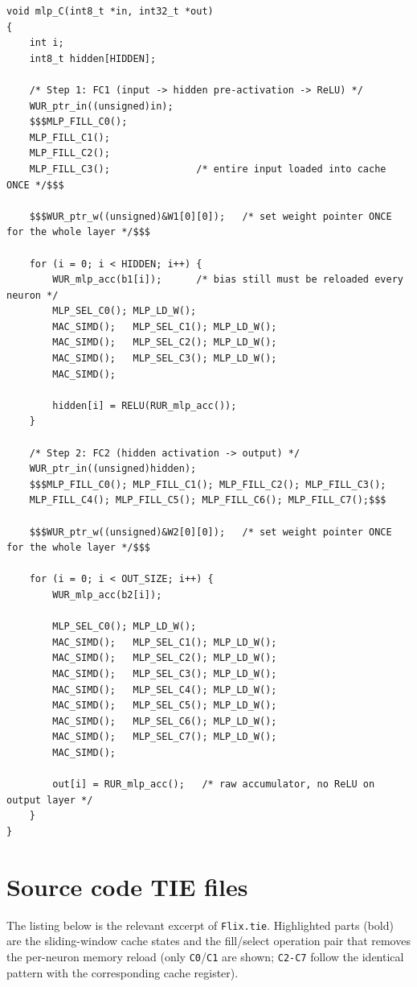 \documentclass[11pt,a4paper]{report}
\begin{document}
\begin{lstlisting}
void mlp_C(int8_t *in, int32_t *out)
{
    int i;
    int8_t hidden[HIDDEN];

    /* Step 1: FC1 (input -> hidden pre-activation -> ReLU) */
    WUR_ptr_in((unsigned)in);
    $$$MLP_FILL_C0();
    MLP_FILL_C1();
    MLP_FILL_C2();
    MLP_FILL_C3();               /* entire input loaded into cache ONCE */$$$

    $$$WUR_ptr_w((unsigned)&W1[0][0]);   /* set weight pointer ONCE for the whole layer */$$$

    for (i = 0; i < HIDDEN; i++) {
        WUR_mlp_acc(b1[i]);      /* bias still must be reloaded every neuron */
        MLP_SEL_C0(); MLP_LD_W();
        MAC_SIMD();   MLP_SEL_C1(); MLP_LD_W();
        MAC_SIMD();   MLP_SEL_C2(); MLP_LD_W();
        MAC_SIMD();   MLP_SEL_C3(); MLP_LD_W();
        MAC_SIMD();

        hidden[i] = RELU(RUR_mlp_acc());
    }

    /* Step 2: FC2 (hidden activation -> output) */
    WUR_ptr_in((unsigned)hidden);
    $$$MLP_FILL_C0(); MLP_FILL_C1(); MLP_FILL_C2(); MLP_FILL_C3();
    MLP_FILL_C4(); MLP_FILL_C5(); MLP_FILL_C6(); MLP_FILL_C7();$$$

    $$$WUR_ptr_w((unsigned)&W2[0][0]);   /* set weight pointer ONCE for the whole layer */$$$

    for (i = 0; i < OUT_SIZE; i++) {
        WUR_mlp_acc(b2[i]);

        MLP_SEL_C0(); MLP_LD_W();
        MAC_SIMD();   MLP_SEL_C1(); MLP_LD_W();
        MAC_SIMD();   MLP_SEL_C2(); MLP_LD_W();
        MAC_SIMD();   MLP_SEL_C3(); MLP_LD_W();
        MAC_SIMD();   MLP_SEL_C4(); MLP_LD_W();
        MAC_SIMD();   MLP_SEL_C5(); MLP_LD_W();
        MAC_SIMD();   MLP_SEL_C6(); MLP_LD_W();
        MAC_SIMD();   MLP_SEL_C7(); MLP_LD_W();
        MAC_SIMD();

        out[i] = RUR_mlp_acc();   /* raw accumulator, no ReLU on output layer */
    }
}
\end{lstlisting}

\section*{Source code TIE files}

The listing below is the relevant excerpt of \texttt{Flix.tie}. Highlighted
parts (bold) are the sliding-window cache states and the fill/select
operation pair that removes the per-neuron memory reload (only
\texttt{C0}/\texttt{C1} are shown; \texttt{C2-C7} follow the identical
pattern with the corresponding cache register).
\end{document}
